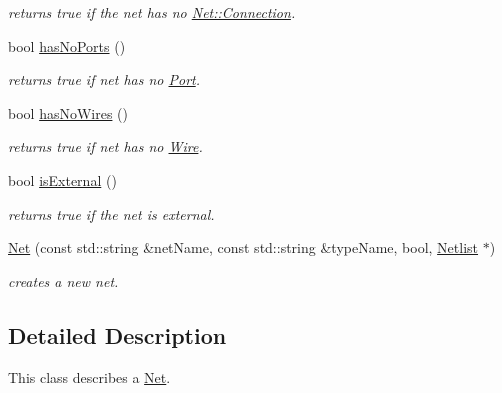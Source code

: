 \begin{DoxyCompactItemize}
\begin{DoxyCompactList}\small\item\em returns true if the net has no \mbox{\hyperlink{class_open_chams_1_1_net_1_1_connection}{Net\+::\+Connection}}. \end{DoxyCompactList}\item 
\mbox{\label{class_open_chams_1_1_net_a3eef7a6d1e945441f197f0918ab8895e}} 
bool \mbox{\hyperlink{class_open_chams_1_1_net_a3eef7a6d1e945441f197f0918ab8895e}{has\+No\+Ports}} ()
\begin{DoxyCompactList}\small\item\em returns true if net has no \mbox{\hyperlink{class_open_chams_1_1_port}{Port}}. \end{DoxyCompactList}\item 
\mbox{\label{class_open_chams_1_1_net_ac9470e72b26d4cddef3d13e69057ee54}} 
bool \mbox{\hyperlink{class_open_chams_1_1_net_ac9470e72b26d4cddef3d13e69057ee54}{has\+No\+Wires}} ()
\begin{DoxyCompactList}\small\item\em returns true if net has no \mbox{\hyperlink{class_open_chams_1_1_wire}{Wire}}. \end{DoxyCompactList}\item 
\mbox{\label{class_open_chams_1_1_net_ab2570574db49633f58f7b64099d6852c}} 
bool \mbox{\hyperlink{class_open_chams_1_1_net_ab2570574db49633f58f7b64099d6852c}{is\+External}} ()
\begin{DoxyCompactList}\small\item\em returns true if the net is external. \end{DoxyCompactList}\item 
\mbox{\hyperlink{class_open_chams_1_1_net_a471976cf479ec4b1f521923d3a4e617d}{Net}} (const std\+::string \&net\+Name, const std\+::string \&type\+Name, bool, \mbox{\hyperlink{class_open_chams_1_1_netlist}{Netlist}} $\ast$)
\begin{DoxyCompactList}\small\item\em creates a new net. \end{DoxyCompactList}\end{DoxyCompactItemize}


\subsection{Detailed Description}
This class describes a \mbox{\hyperlink{class_open_chams_1_1_net}{Net}}. 

